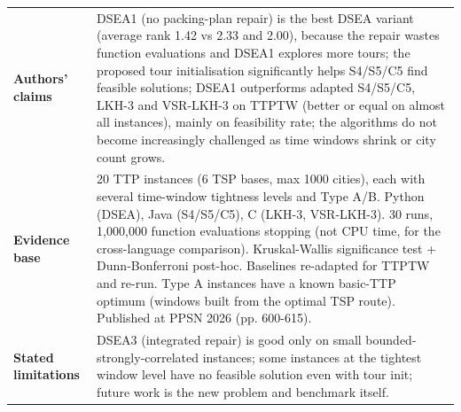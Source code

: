 \documentclass[
  a4paper,
  11pt,
  headings=small,
  numbers=noenddot,
  abstract=on,
  parskip=half,
]{scrartcl}
\begin{document}
\begin{landscape}
\begin{longtable}{@{}p{2.6cm}p{8.7cm}p{2.6cm}p{8.7cm}@{}}
\textbf{Authors' claims} & \multicolumn{3}{p{20.0cm}}{DSEA1 (no packing-plan repair) is the best DSEA variant (average rank 1.42 vs 2.33 and 2.00), because the repair wastes function evaluations and DSEA1 explores more tours; the proposed tour initialisation significantly helps S4/S5/C5 find feasible solutions; DSEA1 outperforms adapted S4/S5/C5, LKH-3 and VSR-LKH-3 on TTPTW (better or equal on almost all instances), mainly on feasibility rate; the algorithms do not become increasingly challenged as time windows shrink or city count grows.} \\
\textbf{Evidence base} & \multicolumn{3}{p{20.0cm}}{20 TTP instances (6 TSP bases, max 1000 cities), each with several time-window tightness levels and Type A/B. Python (DSEA), Java (S4/S5/C5), C (LKH-3, VSR-LKH-3). 30 runs, 1,000,000 function evaluations stopping (not CPU time, for the cross-language comparison). Kruskal-Wallis significance test + Dunn-Bonferroni post-hoc. Baselines re-adapted for TTPTW and re-run. Type A instances have a known basic-TTP optimum (windows built from the optimal TSP route). Published at PPSN 2026 (pp. 600-615).} \\
\textbf{Stated limitations} & \multicolumn{3}{p{20.0cm}}{DSEA3 (integrated repair) is good only on small bounded-strongly-correlated instances; some instances at the tightest window level have no feasible solution even with tour init; future work is the new problem and benchmark itself.} \\

\end{longtable}
\end{landscape}
\end{document}
